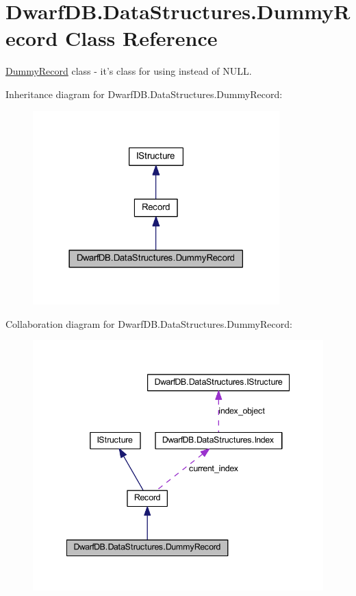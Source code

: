 \hypertarget{class_dwarf_d_b_1_1_data_structures_1_1_dummy_record}{
\section{DwarfDB.DataStructures.DummyRecord Class Reference}
\label{class_dwarf_d_b_1_1_data_structures_1_1_dummy_record}
}


\hyperlink{class_dwarf_d_b_1_1_data_structures_1_1_dummy_record}{DummyRecord} class -\/ it's class for using instead of NULL.  




Inheritance diagram for DwarfDB.DataStructures.DummyRecord:\nopagebreak
\begin{figure}[H]
\begin{center}
\leavevmode
\includegraphics[width=270pt]{class_dwarf_d_b_1_1_data_structures_1_1_dummy_record__inherit__graph}
\end{center}
\end{figure}


Collaboration diagram for DwarfDB.DataStructures.DummyRecord:\nopagebreak
\begin{figure}[H]
\begin{center}
\leavevmode
\includegraphics[width=342pt]{class_dwarf_d_b_1_1_data_structures_1_1_dummy_record__coll__graph}
\end{center}
\end{figure}
